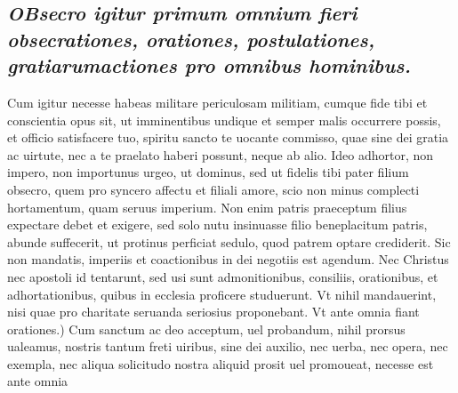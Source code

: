 \documentclass{article}
\begin{document}
\begin{pages}
\subsection*{\textit{\huge\textbf{O}\normalsize Bsecro igitur primum omnium fieri obsecrationes, orationes, postulationes, gratiarumactiones pro omnibus hominibus. }}\pstart Cum igitur necesse habeas militare periculosam militiam, cumque fide tibi et conscientia opus sit, ut imminentibus undique et semper malis occurrere possis, et officio satisfacere tuo, spiritu sancto te uocante commisso, quae sine dei gratia ac uirtute, nec a te praelato haberi possunt, neque ab alio. Ideo adhortor, non impero, non importunus urgeo, ut dominus, sed ut fidelis tibi pater filium obsecro, quem pro syncero affectu et filiali amore, scio non minus complecti hortamentum, quam seruus imperium. Non enim patris praeceptum filius expectare debet et exigere, sed solo nutu insinuasse filio beneplacitum patris, abunde suffecerit, ut protinus perficiat sedulo, quod patrem optare crediderit. Sic non mandatis, imperiis et coactionibus in dei negotiis est agendum. Nec Christus nec apostoli id tentarunt, sed usi sunt admonitionibus, consiliis, orationibus, et adhortationibus, quibus in ecclesia proficere studuerunt. Vt nihil mandauerint, nisi quae pro charitate seruanda seriosius proponebant. Vt ante omnia fiant orationes.) Cum sanctum ac deo acceptum, uel probandum, nihil prorsus ualeamus, nostris tantum freti uiribus, sine dei auxilio, nec uerba, nec opera, nec exempla, nec aliqua solicitudo nostra aliquid prosit uel promoueat, necesse est ante omnia  \pend

\end{pages}
\end{document}
